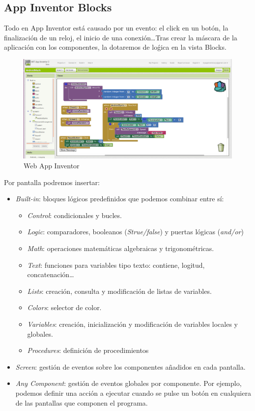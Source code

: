 \documentclass[a4paper, 12pt]{book}
\begin{document}
\subsection{App Inventor Blocks} 
Todo en App Inventor está causado por un evento: el click en un botón, la finalización de un reloj, el inicio de una conexión\ldots Tras crear la máscara de la aplicación con los componentes, la dotaremos de loǵica en la vista Blocks. 
\begin{figure}[H]
  \centering
  \includegraphics[width=\linewidth, keepaspectratio]{img/appBlock}
  \caption{Web App Inventor}
  \label{fig:appinventorgallery}
\end{figure}
Por pantalla podremos insertar: 
\begin{itemize}	
	\item \textit{Built-in}: bloques lógicos predefinidos que podemos combinar entre sí:
		\begin{itemize}	
		\item \textit{Control}: condicionales y bucles.
		\item \textit{Logic}: comparadores, booleanos (\textit{Strue/false}) y puertas lógicas (\textit{and/or})	
		\item \textit{Math}: operaciones matemáticas algebraicas y trigonométricas.	
		\item \textit{Text}: funciones para variables tipo texto: contiene, logitud, concatenación\ldots	
		\item \textit{Lists}: creación, consulta y modificación de listas de variables. 	
		\item \textit{Colors}: selector de color.
		\item \textit{Variables}: creación, inicialización y modificación de variables locales y globales.
		\item \textit{Procedures}: definición de procedimientos
		\end{itemize}
	\item \textit{Screen}: gestión de eventos sobre los componentes añadidos en cada pantalla. 
	\item \textit{Any Component}: gestión de eventos globales por componente. Por ejemplo, podemos definir una acción a ejecutar cuando se pulse un botón en cualquiera de las pantallas que componen el programa.  

\end{itemize}
\end{document}
